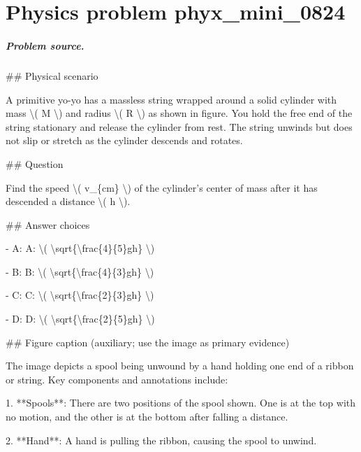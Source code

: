 
\chapter{Physics problem phyx\_mini\_0824}
\label{ch:PhyXMiniProblems_problem_phyx_mini_0824}

\paragraph{Problem source.}
\#\# Physical scenario

A primitive yo-yo has a massless string wrapped around a solid cylinder with mass \textbackslash{}( M \textbackslash{}) and radius \textbackslash{}( R \textbackslash{}) as shown in figure. You hold the free end of the string stationary and release the cylinder from rest. The string unwinds but does not slip or stretch as the cylinder descends and rotates.

\#\# Question

Find the speed \textbackslash{}( v\_\{cm\} \textbackslash{}) of the cylinder's center of mass after it has descended a distance \textbackslash{}( h \textbackslash{}).

\#\# Answer choices

- A: A: \textbackslash{}( \textbackslash{}sqrt\{\textbackslash{}frac\{4\}\{5\}gh\} \textbackslash{})

- B: B: \textbackslash{}( \textbackslash{}sqrt\{\textbackslash{}frac\{4\}\{3\}gh\} \textbackslash{})

- C: C: \textbackslash{}( \textbackslash{}sqrt\{\textbackslash{}frac\{2\}\{3\}gh\} \textbackslash{})

- D: D: \textbackslash{}( \textbackslash{}sqrt\{\textbackslash{}frac\{2\}\{5\}gh\} \textbackslash{})

\#\# Figure caption (auxiliary; use the image as primary evidence)

The image depicts a spool being unwound by a hand holding one end of a ribbon or string. Key components and annotations include:

1. **Spools**: There are two positions of the spool shown. One is at the top with no motion, and the other is at the bottom after falling a distance.

2. **Hand**: A hand is pulling the ribbon, causing the spool to unwind.

